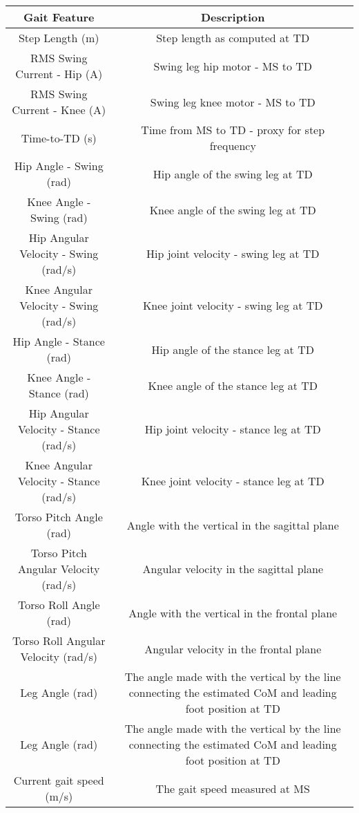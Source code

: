 \setlength\extrarowheight{2pt} 
\begin{tabularx}{\linewidth}{|C|C|}
	\hline
	\textbf{Gait Feature}	& \textbf{Description} \\
	\hline
	Step Length (m)	& Step length as computed at TD \\
	\hline
	RMS Swing Current - Hip (A)	& Swing leg hip motor - MS to TD \\
	\hline
	RMS Swing Current - Knee (A) & Swing leg knee motor - MS to TD \\
	\hline
	Time-to-TD (s)	& Time from MS to TD - proxy for step frequency \\
	\hline
	Hip Angle - Swing (rad)	& Hip angle of the swing leg at TD \\
	\hline
	Knee Angle - Swing (rad)	& Knee angle of the swing leg at TD \\
	\hline
	Hip Angular Velocity - Swing (rad/s) & Hip joint velocity - swing leg at TD \\
	\hline
	Knee Angular Velocity - Swing (rad/s)	&  Knee joint velocity - swing leg at TD \\
	\hline
	Hip Angle - Stance (rad) & Hip angle of the stance leg at TD \\
	\hline
	Knee Angle - Stance (rad) & Knee angle of the stance leg at TD \\
	\hline
	Hip Angular Velocity - Stance (rad/s) & Hip joint velocity - stance leg at TD \\
	\hline
	Knee Angular Velocity - Stance (rad/s) & Knee joint velocity - stance leg at TD \\
	\hline
	Torso Pitch Angle (rad)	&  Angle with the vertical in the sagittal plane\\
	\hline
	Torso Pitch Angular Velocity (rad/s) & Angular velocity in the sagittal plane \\
	\hline
	Torso Roll Angle (rad) &  Angle with the vertical in the frontal plane \\
	\hline
	Torso Roll Angular Velocity (rad/s)	& Angular velocity in the frontal plane  \\
	\hline
	Leg Angle (rad) & The angle made with the vertical by the line connecting the estimated CoM and leading foot position at TD \\
	\hline
	Leg Angle (rad) & The angle made with the vertical by the line connecting the estimated CoM and leading foot position at TD \\
	\hline
	Current gait speed (m/s) & The gait speed measured at MS \\
	\hline
\end{tabularx}